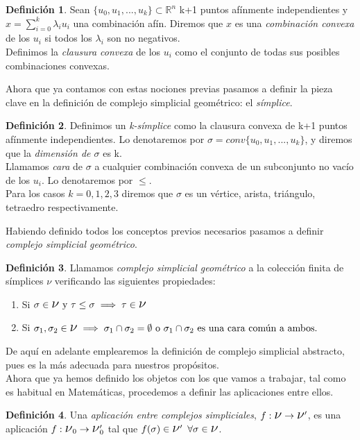\documentclass[12pt]{article}
\numberwithin{equation}{section}
\theoremstyle{definition}
\newtheorem{defi}{Definición}
\theoremstyle{remark}
\theoremstyle{plain}
\begin{document}
	\begin{defi}
		Sean $\{u_{0},u_{1},...,u_{k}\}\subset\mathbb{R}^{n}$ k+1 
		puntos afínmente independientes y $x=\sum_{i=0}^{k}
		\lambda_{i}u_{i}$ una combinación afín. Diremos que $x$ es una
		\textit{combinación convexa} de los $u_{i}$ si todos los 
		$\lambda_{i}$ son no negativos.\\
		Definimos la \textit{clausura convexa} de los $u_{i}$ como el
		conjunto de todas sus posibles combinaciones convexas.
	\end{defi}

	Ahora que ya contamos con estas nociones previas pasamos a definir la 
	pieza clave en la definición de complejo simplicial geométrico: el 
	\emph{símplice}.

	\begin{defi}
		Definimos un \textit{k-símplice} como la clausura convexa de 
		k+1 puntos afínmente independientes. Lo denotaremos por 
		$\sigma=conv\{u_{0},u_{1},...,u_{k}\}$, y diremos que la 
		\textit{dimensión de $\sigma$} es k.\\
		Llamamos \textit{cara} de $\sigma$ a cualquier combinación 
		convexa de un subconjunto no vacío de los $u_{i}$. Lo 
		denotaremos por $\leq$.\\
		Para los casos $k=0,1,2,3$ diremos que $\sigma$ es un vértice,
		arista, triángulo, tetraedro respectivamente.
	\end{defi}

	Habiendo definido todos los conceptos previos necesarios pasamos a 
	definir \emph{complejo simplicial geométrico}.

	\begin{defi}
		Llamamos \textit{complejo simplicial geométrico} a la 
		colección finita de símplices {\Large $\nu$} verificando las
		siguientes propiedades:
		\begin{enumerate}
			\item Si $\sigma\in \text{{\Large $\nu$} y }
				\tau \leq \sigma \implies \tau \in 
				\text{{\Large $\nu$}}$
			\item Si $\sigma_{1},\sigma_{2} \in 
				\text{{\Large $\nu$}} \implies 
				\sigma_{1}\cap\sigma_{2}=\emptyset \text{ o }
				\sigma_{1}\cap\sigma_{2} \text{ es una cara 
				común a ambos.}$
		\end{enumerate}
	\end{defi}
	
	De aquí en adelante emplearemos la definición de complejo simplicial 
	abstracto, pues es la más adecuada para nuestros propósitos.\\
	Ahora que ya hemos definido los objetos con los que vamos a trabajar, 
	tal como es habitual en Matemáticas, procedemos a definir las 
	aplicaciones entre ellos.
	\begin{defi}
		Una \textit{aplicación entre complejos simpliciales}, 
		$f:\text{{\Large $\nu$}} \rightarrow \text{{\Large 
		$\nu$}$^{\prime}$}$, es una aplicación $f:\text{{\Large 
		$\nu$}$_{0}$} \rightarrow \text{{\Large $\nu$}$_{0}^{\prime}$}$ 
		tal que $f(\sigma) \in \text{{\Large $\nu$}$^{\prime}$} 
		\hspace{5pt} \forall \sigma \in \text{{\Large $\nu$}}$.
	\end{defi}
	
\end{document}
